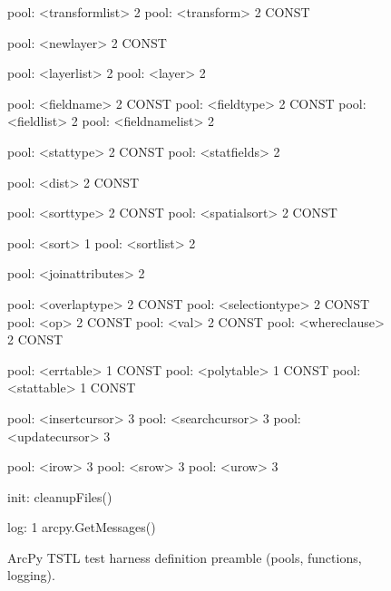 \begin{figure}
{\begin{code}
pool: <transformlist> 2
pool: <transform> 2 CONST

pool: <newlayer> 2 CONST

pool: <layerlist> 2
pool: <layer> 2

pool: <fieldname> 2 CONST
pool: <fieldtype> 2 CONST
pool: <fieldlist> 2
pool: <fieldnamelist> 2

pool: <stattype> 2 CONST
pool: <statfields> 2

pool: <dist> 2 CONST

pool: <sorttype> 2 CONST
pool: <spatialsort> 2 CONST

pool: <sort> 1
pool: <sortlist> 2

pool: <joinattributes> 2

pool: <overlaptype> 2 CONST
pool: <selectiontype> 2 CONST
pool: <op> 2 CONST
pool: <val> 2 CONST
pool: <whereclause> 2 CONST

pool: <errtable> 1 CONST
pool: <polytable> 1 CONST
pool: <stattable> 1 CONST

pool: <insertcursor> 3
pool: <searchcursor> 3
pool: <updatecursor> 3

pool: <irow> 3
pool: <srow> 3
pool: <urow> 3

init: cleanupFiles()

log: 1 arcpy.GetMessages()
\end{code}
}
\caption{ArcPy TSTL test harness definition preamble (pools, functions, logging).}
\label{preamble}
\end{figure}

